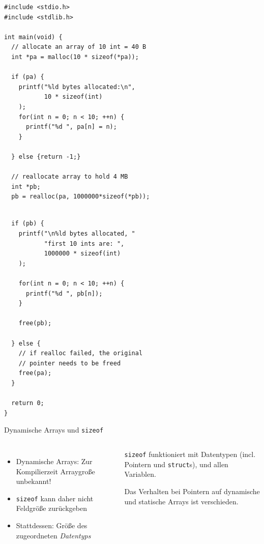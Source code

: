 
\begin{frame}[fragile]
%
%
\begin{codebox}[Beispiel]
\begin{verbatim}
#include <stdio.h>
#include <stdlib.h>
 
int main(void) {
  // allocate an array of 10 int = 40 B
  int *pa = malloc(10 * sizeof(*pa));
  
  if (pa) {
    printf("%ld bytes allocated:\n",
           10 * sizeof(int)
    );
    for(int n = 0; n < 10; ++n) {
      printf("%d ", pa[n] = n);
    }
    
  } else {return -1;}
  
  // reallocate array to hold 4 MB
  int *pb;
  pb = realloc(pa, 1000000*sizeof(*pb));
\end{verbatim}
\end{codebox}
%
\begin{codebox}[...Fortsetzung, equal height group = grpXmpReallocCheck]
\begin{verbatim}
  
  if (pb) {
    printf("\n%ld bytes allocated, "
           "first 10 ints are: ", 
           1000000 * sizeof(int)
    );
    
    for(int n = 0; n < 10; ++n) {
      printf("%d ", pb[n]);
    }
    
    free(pb);
    
  } else { 
    // if realloc failed, the original 
    // pointer needs to be freed
    free(pa);
  }
  
  return 0;
}
\end{verbatim}
\end{codebox}
%
\end{frame}


\begin{frame}{Dynamische Arrays und \texttt{sizeof}}
%
\begin{columns}[T]
\begin{itemize}
\item Dynamische Arrays: Zur Kompilierzeit Arraygroße unbekannt!
\item \texttt{sizeof} kann daher nicht Feldgröße zurückgeben
\item Stattdessen: Größe des zugeordneten \emph{Datentyps}
\end{itemize}
%
\begin{hintbox}
\texttt{sizeof} funktioniert mit Datentypen (incl. Pointern und \texttt{struct}s), und allen Variablen. 

Das Verhalten bei Pointern auf dynamische und statische Arrays ist verschieden.
\end{hintbox}
\end{columns}

%
\end{frame}

